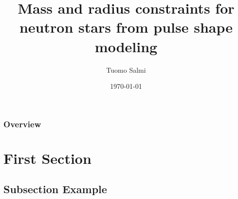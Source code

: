 \documentclass{beamer}
\title{Mass and radius constraints for neutron stars from pulse shape modeling }
\author{Tuomo Salmi} %
\institute[UTU] %
{
University of Turku \\ %
\medskip
\textit{thjsal@utu.fi} %
}
\date{\today} %
\begin{document}
\begin{frame}
\titlepage %
\end{frame}

\begin{frame}
\frametitle{Overview} %
\tableofcontents %
\end{frame}


\section{First Section} %

\subsection{Subsection Example} %
\end{document}
